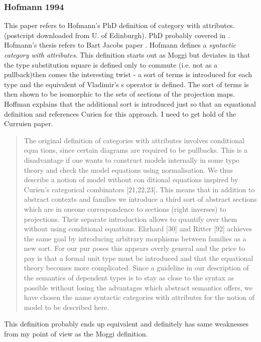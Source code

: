 \documentclass[14pt,a4paper]{scrartcl}
\begin{document}
\subsubsection{Hofmann 1994}
This paper refers to Hofmann's PhD definition of category with attributes.
(postcript downloaded from U. of Edinburgh). PhD probably covered in \cite{hofmann94}.
Hofmann's thesis refers to Bart Jacobs paper \cite{jacobs93}.
\noindent
Hofmann defines a \textit{syntactic category with attributes}.
This definition starts out as Moggi but deviates in that the  type substitution square is defined only to commute (i.e. not as a pullback)then comes the interesting twist - 
a sort of terms is introduced for each type and  the equivalent of Vladimir's s operator is defined. The sort of terms is then shown to be isomorphic 
to the sets of sections of the projection maps. Hoffman explains that
the additional sort is introduced just so that an equational definition and references Curien for this approach. I need to get hold of the Curruien paper.
\begin{quote}
The original definition of categories with attributes involves conditional equa­ 
tions, since certain diagrams are required to be pullbacks. This is a disadvantage if 
one wants to construct models internally in some type theory and check the model 
equations using normalisation. We thus describe a notion of model without con­ 
ditional equations inspired by Curien's categorical combinators [21,22,23]. This 
means that in addition to abstract contexts and families we introduce a third sort 
of abstract sections which are in one­one correspondence to sections (right inverses) 
to projections. Their separate introduction allows to quantify over them without 
using conditional equations. Ehrhard [30] and Ritter [92] achieves the same goal 
by introducing arbitrary morphisms between families as a new sort. For our pur­ 
poses this appears overly general and the price to pay is that a formal unit type 
must be introduced and that the equational theory becomes more complicated. 
Since a guideline in our description of the semantics of dependent types is to 
stay as close to the syntax as possible without losing the advantages which abstract 
semantics offers, we have chosen the name syntactic categories with attributes for 
the notion of model to be described here. 
\end{quote}

This definition probably ends up equivalent and definitely 
has same weaknesses from my point of view as the Moggi definition.
\end{document}
